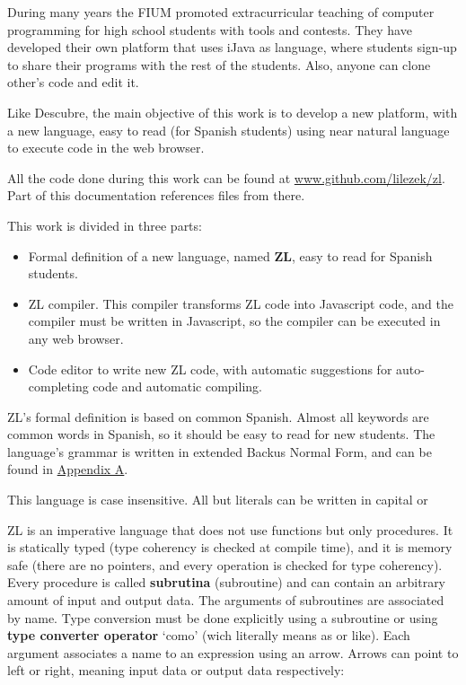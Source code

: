 \documentclass{report}
\begin{document}
	
	During many years the FIUM promoted extracurricular teaching of computer programming for high school students with tools and contests. They have developed their own platform that uses iJava as language, where students sign-up to share their programs with the rest of the students. Also, anyone can clone other's code and edit it.
	
	
	Like Descubre, the main objective of this work is to develop a new platform, with a new language, easy to read (for Spanish students) using near natural language to execute code in the web browser.
	
	All the code done during this work can be found at \url{www.github.com/lilezek/zl}. Part of this documentation references files from there. 
	
	This work is divided in three parts:
	
	\begin{itemize}
		\item Formal definition of a new language, named \textbf{ZL}, easy to read for Spanish students.
		\item ZL compiler. This compiler transforms ZL code into Javascript code, and the compiler must be written in Javascript, so the compiler can be executed in any web browser.
		\item Code editor to write new ZL code, with automatic suggestions for auto-completing code and automatic compiling.
	\end{itemize} 
	
	ZL's formal definition is based on common Spanish. Almost all keywords are common words in Spanish, so it should be easy to read for new students. The language's grammar is written in extended Backus Normal Form, and can be found in \hyperref[app:a]{Appendix A}.
	
	This language is case insensitive. All but literals can be written in capital or 
	
	ZL is an imperative language that does not use functions but only procedures. It is statically typed (type coherency is checked at compile time), and it is memory safe (there are no pointers, and every operation is checked for type coherency). Every procedure is called \textbf{subrutina} (subroutine) and can contain an arbitrary amount of input and output data. The arguments of subroutines are associated by name. Type conversion must be done explicitly using a subroutine or using \textbf{type converter operator} `como' (wich literally means as or like). Each argument associates a name to an expression using an arrow. Arrows can point to left or right, meaning input data or output data respectively: 
	
\end{document}
